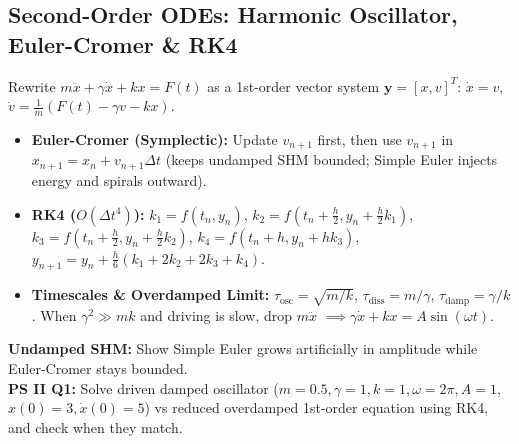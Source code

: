 \documentclass[10pt,a4paper]{article}
\begin{document}
\subsection{Second-Order ODEs: Harmonic Oscillator, Euler-Cromer \& RK4}
\begin{theorybox}
Rewrite $m\ddot x + \gamma\dot x + kx = F(t)$ as a 1st-order vector system $\mathbf{y} = [x, v]^T$: $\dot x = v$, \; $\dot v = \frac{1}{m}(F(t) - \gamma v - kx)$.
\begin{itemize}
\item \textbf{Euler-Cromer (Symplectic):} Update $v_{n+1}$ first, then use $v_{n+1}$ in $x_{n+1} = x_n + v_{n+1}\Delta t$ (keeps undamped SHM bounded; Simple Euler injects energy and spirals outward).
\item \textbf{RK4 ($O(\Delta t^4)$):} $k_1 = f(t_n,y_n)$, $k_2 = f(t_n+\frac{h}{2}, y_n+\frac{h}{2}k_1)$, $k_3 = f(t_n+\frac{h}{2}, y_n+\frac{h}{2}k_2)$, $k_4 = f(t_n+h, y_n+h k_3)$, $y_{n+1} = y_n + \frac{h}{6}(k_1 + 2k_2 + 2k_3 + k_4)$.
\item \textbf{Timescales \& Overdamped Limit:} $\tau_{\text{osc}}=\sqrt{m/k}$, $\tau_{\text{diss}}=m/\gamma$, $\tau_{\text{damp}}=\gamma/k$. When $\gamma^2 \gg mk$ and driving is slow, drop $m\ddot x$ $\implies \gamma\dot x + kx = A\sin(\omega t)$.
\end{itemize}
\end{theorybox}

\begin{goalbox}
\textbf{Undamped SHM:} Show Simple Euler grows artificially in amplitude while Euler-Cromer stays bounded.\\
\textbf{PS II Q1:} Solve driven damped oscillator ($m=0.5, \gamma=1, k=1, \omega=2\pi, A=1$, $x(0)=3, \dot x(0)=5$) vs reduced overdamped 1st-order equation using RK4, and check when they match.
\end{goalbox}
\end{document}
